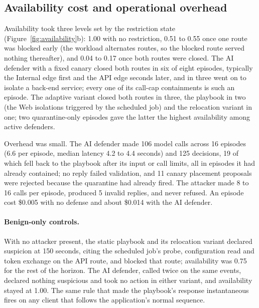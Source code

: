 \documentclass[10pt,a4paper]{article}
\begin{document}
\subsection{Availability cost and operational overhead}\label{sec:results-cost}

Availability took three levels set by the restriction state (Figure~\ref{fig:availability}b): 1.00 with no restriction, 0.51 to 0.55 once one route was blocked early (the workload alternates routes, so the blocked route served nothing thereafter), and 0.04 to 0.17 once both routes were closed. The AI defender with a fixed canary closed both routes in six of eight episodes, typically the Internal edge first and the API edge seconds later, and in three went on to isolate a back-end service; every one of its call-cap containments is such an episode. The adaptive variant closed both routes in three, the playbook in two (the Web isolations triggered by the scheduled job) and the relocation variant in one; two quarantine-only episodes gave the latter the highest availability among active defenders.

Overhead was small. The AI defender made 106 model calls across 16 episodes (6.6 per episode, median latency 4.2 to 4.4 seconds) and 125 decisions, 19 of which fell back to the playbook after its input or call limits, all in episodes it had already contained; no reply failed validation, and 11 canary placement proposals were rejected because the quarantine had already fired. The attacker made 8 to 16 calls per episode, produced 5 invalid replies, and never refused. An episode cost \$0.005 with no defense and about \$0.014 with the AI defender.



\paragraph{Benign-only controls.}
With no attacker present, the static playbook and its relocation variant declared suspicion at 150 seconds, citing the scheduled job's probe, configuration read and token exchange on the API route, and blocked that route; availability was 0.75 for the rest of the horizon. The AI defender, called twice on the same events, declared nothing suspicious and took no action in either variant, and availability stayed at 1.00. The same rule that made the playbook's response instantaneous fires on any client that follows the application's normal sequence.
\end{document}

